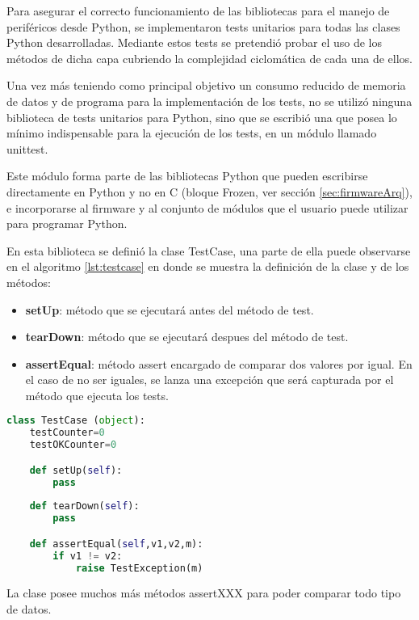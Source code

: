 Para asegurar el correcto funcionamiento de las bibliotecas para el manejo de periféricos desde Python, se implementaron tests unitarios para todas las clases Python desarrolladas. Mediante estos tests se pretendió probar el uso de los métodos de dicha capa cubriendo la complejidad ciclomática de cada una de ellos.

Una vez más teniendo como principal objetivo un consumo reducido de memoria de datos y de programa para la implementación de los tests, no se utilizó ninguna biblioteca de tests unitarios para Python, sino que se escribió una que posea lo mínimo indispensable para la ejecución de los tests, en un módulo llamado unittest. 

Este módulo forma parte de las bibliotecas Python que pueden escribirse directamente en Python y no en C (bloque Frozen, ver sección \ref{sec:firmwareArq}), e incorporarse al firmware y al conjunto de módulos que el usuario puede utilizar para programar Python.

En esta biblioteca se definió la clase TestCase, una parte de ella puede observarse en el algoritmo \ref{lst:testcase} en donde se muestra la definición de la clase y de los métodos:

\begin{itemize}
	\item \textbf{setUp}: método que se ejecutará antes del método de test.
	\item \textbf{tearDown}: método que se ejecutará despues del método de test.
	\item \textbf{assertEqual}: método assert encargado de comparar dos valores por igual. En el caso de no ser iguales, se lanza una excepción que será capturada por el método que ejecuta los tests.
\end{itemize}

\begin{lstlisting}[label={lst:testcase},caption=Clase TestCase utilizada para crear tests unitarios para Python., language={python}]
class TestCase (object):
    testCounter=0
    testOKCounter=0

    def setUp(self):
        pass
    
    def tearDown(self):
        pass

    def assertEqual(self,v1,v2,m):
        if v1 != v2:
            raise TestException(m)
\end{lstlisting}

La clase posee muchos más métodos assertXXX para poder comparar todo tipo de datos.

